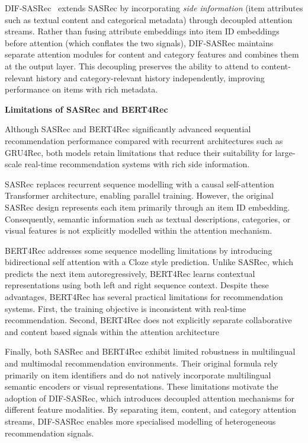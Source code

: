 DIF-SASRec~\cite{xie2022difsasrec} extends SASRec by incorporating \textit{side information} (item attributes such as textual content and categorical metadata) through decoupled attention streams.
Rather than fusing attribute embeddings into item ID embeddings before attention (which conflates the two signals), DIF-SASRec maintains separate attention modules for content and category features and combines them at the output layer.
This decoupling preserves the ability to attend to content-relevant history and category-relevant history independently, improving performance on items with rich metadata.


\medskip
\noindent\textbf{Limitations of SASRec and BERT4Rec}


Although SASRec and BERT4Rec significantly advanced sequential recommendation performance compared with recurrent architectures such as GRU4Rec, both models retain limitations that reduce their suitability for large-scale real-time recommendation systems with rich side information.

SASRec replaces recurrent sequence modelling with a causal self-attention Transformer architecture, enabling parallel training. However, the original SASRec design represents each item primarily through an item ID embedding. Consequently, semantic information such as textual descriptions, categories, or visual features is not explicitly modelled within the attention mechanism.

BERT4Rec addresses some sequence modelling limitations by introducing bidirectional self attention with a Cloze style prediction. Unlike SASRec, which predicts the next item autoregressively, BERT4Rec learns contextual representations using both left and right sequence context. Despite these advantages, BERT4Rec has several practical limitations for recommendation systems. First, the training objective is inconsistent with real-time recommendation. Second, BERT4Rec does not explicitly separate collaborative and content based signals within the attention architecture

Finally, both SASRec and BERT4Rec exhibit limited robustness in multilingual and multimodal recommendation environments. Their original formula rely primarily on item identifiers and do not natively incorporate multilingual semantic encoders or visual representations. These limitations motivate the adoption of DIF-SASRec, which introduces decoupled attention mechanisms for different feature modalities. By separating item, content, and category attention streams, DIF-SASRec enables more specialised modelling of heterogeneous recommendation signals.

